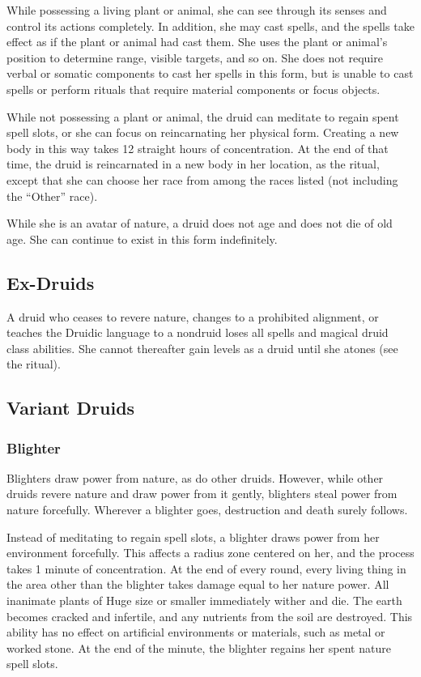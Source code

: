     While possessing a living plant or animal, she can see through its senses and control its actions completely.
    In addition, she may cast spells, and the spells take effect as if the plant or animal had cast them.
    She uses the plant or animal's position to determine range, visible targets, and so on.
    She does not require verbal or somatic components to cast her spells in this form, but is unable to cast spells or perform rituals that require material components or focus objects.

    While not possessing a plant or animal, the druid can meditate to regain spent spell slots, or she can focus on reincarnating her physical form.
    Creating a new body in this way takes 12 straight hours of concentration.
    At the end of that time, the druid is reincarnated in a new body in her location, as the  ritual, except that she can choose her race from among the races listed (not including the ``Other'' race).

    While she is an avatar of nature, a druid does not age and does not die of old age.
    She can continue to exist in this form indefinitely.

    \subsection{Ex-Druids}
        A druid who ceases to revere nature, changes to a prohibited alignment, or teaches the Druidic language to a nondruid loses all spells and magical druid class abilities.
        She cannot thereafter gain levels as a druid until she atones (see the  ritual).

    \subsection{Variant Druids}

        \subsubsection{Blighter}

            Blighters draw power from nature, as do other druids. However, while other druids revere nature and draw power from it gently, blighters steal power from nature forcefully. Wherever a blighter goes, destruction and death surely follows.

             Instead of meditating to regain spell slots, a blighter draws power from her environment forcefully.
            This affects a \areahuge radius zone centered on her, and the process takes 1 minute of concentration.
            At the end of every round, every living thing in the area other than the blighter takes damage equal to her nature power.
            All inanimate plants of Huge size or smaller immediately wither and die.
            The earth becomes cracked and infertile, and any nutrients from the soil are destroyed.
            This ability has no effect on artificial environments or materials, such as metal or worked stone.
            At the end of the minute, the blighter regains her spent nature spell slots.

